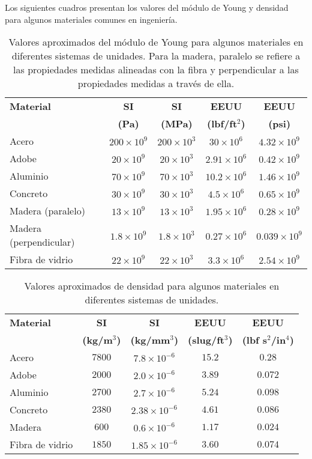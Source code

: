 Los siguientes cuadros presentan los valores del módulo de Young y densidad para algunos materiales comunes en ingeniería.
\begin{table}[h]
\centering
\begin{tabular}{lcccc}
\hline 
\textbf{Material} & \textbf{SI}  & \textbf{SI} & \textbf{EEUU} & \textbf{EEUU} \\
   & \textbf{(Pa)}  & \textbf{(MPa)} & \textbf{(lbf/ft$^2$)} & \textbf{(psi)} \\ 
\hline
Acero   &$200\times 10^9$ &$200\times 10^3$ &$30\times 10^6$ &$4.32\times 
10^9$\\
Adobe & $20 \times 10^9$ &$20 \times 10^3$ &$2.91 \times 10^6$ &$0.42 \times 
10^9$ \\
Aluminio &$70\times 10^9$ &$70 \times 10^3$ &$10.2 \times 10^6$ &$1.46 \times 10^9$\\
Concreto & $30\times 10^9$ &$30\times 10^3$ &$4.5\times 10^6$ &$0.65\times 
10^9$\\
Madera (paralelo) & $13\times 10^9$ &$13\times 10^3$ &$1.95\times 10^6$ 
&$0.28\times 10^9$\\
Madera (perpendicular) & $1.8\times 10^9$ &$1.8\times 10^3$ &$0.27\times 10^6$ 
&$0.039\times 10^9$\\
Fibra de vidrio & $22\times 10^9$ &$22\times 10^3$ &$3.3\times 10^6$ 
&$2.54\times 10^9$\\
\hline 
\end{tabular}
\caption{Valores aproximados del módulo de Young para algunos materiales en 
diferentes sistemas de unidades. Para la madera, paralelo se refiere a las 
propiedades medidas alineadas con la fibra y perpendicular a las propiedades
medidas a través de ella.}
\end{table}
\begin{table}[h]
\centering
\begin{tabular}{lcccc}
\hline 
\textbf{Material} & \textbf{SI}  & \textbf{SI} & \textbf{EEUU} & \textbf{EEUU} \\
 & \textbf{(kg/m$^3$)}  & \textbf{(kg/mm$^3$)} & \textbf{(slug/ft$^3$)} & \textbf{(lbf s$^2$/in$^4$)} \\ 
\hline
Acero   &$7800$ &$7.8 \times 10^{-6}$ &$15.2$ &$0.28$\\
Adobe   &$2000$ &$2.0 \times 10^{-6}$ &$3.89$ &$0.072$\\
Aluminio &$2700$ &$2.7 \times 10^{-6}$ &$5.24$ &$0.098$\\
Concreto & $2380$ &$2.38 \times 10^{-6}$ &$4.61$ &$0.086$\\
Madera   &$600$ &$0.6 \times 10^{-6}$ &$1.17$ &$0.024$\\ 
Fibra de vidrio  &$1850$ &$1.85 \times 10^{-6}$ &$3.60$ &$0.074$\\
\hline 
\end{tabular}
\caption{Valores aproximados de densidad para algunos materiales en diferentes 
sistemas de unidades.}
\end{table}


